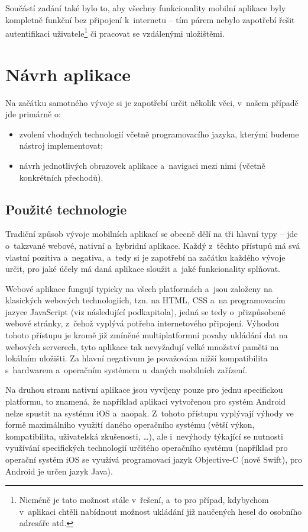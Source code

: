 Součástí zadání také bylo to, aby všechny funkcionality mobilní aplikace
byly kompletně funkční bez připojení k~internetu -- tím párem nebylo
zapotřebí řešit autentifikaci
uživatele\footnote{Nicméně je tato možnost stále v~řešení, a~to pro případ, kdybychom v~aplikaci chtěli nabídnout možnost ukládání již naučených hesel do osobního adresáře atd.}
či pracovat se vzdálenými uložištěmi.

\hypertarget{nuxe1vrh-aplikace}{%
\section{Návrh aplikace}\label{nuxe1vrh-aplikace}}

Na začátku samotného vývoje si je zapotřebí určit několik věci, v~našem
případě jde primárně o:

\begin{itemize}
\tightlist
\item
  zvolení vhodných technologií včetně programovacího jazyka, kterými
  budeme nástroj implementovat;
\item
  návrh jednotlivých obrazovek aplikace a~navigaci mezi nimi (včetně
  konkrétních přechodů).
\end{itemize}

\hypertarget{pouux17eituxe9-technologie}{%
\subsection{Použité technologie}\label{pouux17eituxe9-technologie}}

Tradiční způsob vývoje mobilních aplikací se obecně dělí na tři hlavní
typy -- jde o~takzvané webové, nativní a~hybridní aplikace. Každý
z~těchto přístupů má svá vlastní pozitiva a~negativa, a~tedy si je
zapotřebí na začátku každého vývoje určit, pro jaké účely má daná
aplikace sloužit a~jaké funkcionality splňovat.

Webové aplikace fungují typicky na všech platformách a~jsou založeny na
klasických webových technologiích, tzn. na HTML, CSS a~na programovacím
jazyce JavaScript (viz následující podkapitola), jedná se tedy
o~přizpůsobené webové stránky, z~čehož vyplývá potřeba internetového
připojení. Výhodou tohoto přístupu je kromě již zmíněné multiplatformní
povahy ukládání dat na webových serverech, tyto aplikace tak nevyžadují
velké množství paměti na lokálním uložišti. Za hlavní negativum je
považována nižší kompatibilita s~hardwarem a~operačním systémem u~daných
mobilních zařízení.

Na druhou stranu nativní aplikace jsou vyvíjeny pouze pro jednu
specifickou platformu, to znamená, že například aplikaci vytvořenou pro
systém Android nelze spustit na systému iOS a~naopak. Z~tohoto přístupu
vyplývají výhody ve formě maximálního využití daného operačního systému
(větší výkon, kompatibilita, uživatelská zkušenosti, \ldots{}), ale
i~nevýhody týkající se nutnosti využívání specifických technologií
určitého operačního systému (například pro operační systém iOS se
využívá programovací jazyk Objective-C (nově Swift), pro Android je
určen jazyk Java).

